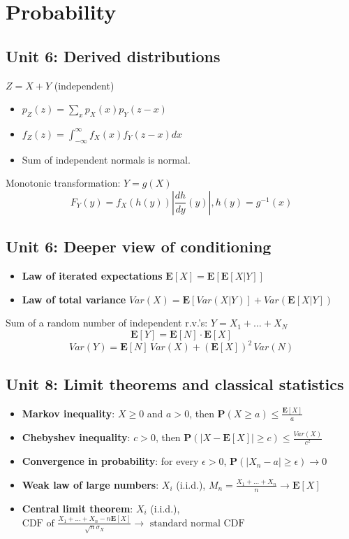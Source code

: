 \section{Probability} 

\subsection*{Unit 6: Derived distributions}

$Z = X+Y$ (independent)
\begin{itemize}
\item $p_Z(z) = \sum_x p_X(x) p_Y(z-x)$
\item $f_Z(z) = \int_{-\infty}^{\infty} f_X(x) f_Y(z-x) dx$
\item Sum of independent normals is normal. 
\end{itemize}

Monotonic transformation: $Y = g(X)$
\[ F_Y(y) = f_X(h(y))\left|\frac{dh}{dy}(y)\right|, h(y) = g^{-1}(x) \]

\subsection*{Unit 6: Deeper view of conditioning}
\begin{itemize}
\item \textbf{Law of iterated expectations} $\mathbf{E}[X] = \mathbf{E}\left[\mathbf{E}[X|Y] \right]$
\item \textbf{Law of total variance} $Var(X) = \mathbf{E}\left[Var(X|Y)\right] + Var(\mathbf{E}[X|Y])$
\end{itemize}

Sum of a random number of independent r.v.'s: $Y = X_1 + \ldots + X_N$
\[ \mathbf{E}[Y] = \mathbf{E}[N] \cdot \mathbf{E}[X] \]
\[ Var(Y) = \mathbf{E}[N]\,Var(X) + (\mathbf{E}[X])^2\,Var(N) \]


\subsection*{Unit 8: Limit theorems and classical statistics}

\begin{itemize}
\item \textbf{Markov inequality}: $X \geq 0$ and $a > 0$, then $\mathbf{P}(X \geq a) \leq \frac{\mathbf{E}[X]}{a}$
\item \textbf{Chebyshev inequality}: $c > 0$, then $\mathbf{P}(|X - \mathbf{E}[X]| \geq c) \leq \frac{Var(X)}{c^2}$
\item \textbf{Convergence in probability}: for every $\epsilon > 0$, $\mathbf{P}(|X_n - a| \geq \epsilon) \rightarrow 0$
\item \textbf{Weak law of large numbers}: $X_i$ (i.i.d.), $M_n = \frac{X_1 + \ldots + X_n}{n} \rightarrow \mathbf{E}[X]$
\item \textbf{Central limit theorem}: $X_i$ (i.i.d.), $\text{CDF of }\frac{X_1 + \ldots + X_n - n\mathbf{E}[X]}{\sqrt{n}\sigma_X} \rightarrow \text{ standard normal CDF}$
\end{itemize}

